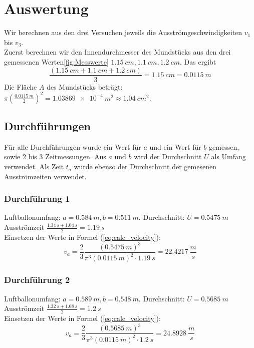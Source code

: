 \documentclass{article}
\begin{document}
    \section{Auswertung}
    Wir berechnen aus den drei Versuchen jeweils die Ausströmgeschwindigkeiten \(v_1\) bis \(v_3\). \\
    Zuerst berechnen wir den Innendurchmesser des Mundstücks aus den drei gemessenen Werten\ref{fig:Messwerte}
    \(\SI{1.15}{cm}, \SI{1.1}{cm}, \SI{1.2}{cm} \). Das ergibt
    \begin{equation}
        \frac{ (\SI{1.15}{cm} + \SI{1.1}{cm} + \SI{1.2}{cm}) }{3} = \SI{1.15}{cm} = \SI{0.0115}{m}
    \end{equation}
    Die Fläche \(A\) des Mundstücks beträgt\label{eq:fläche_berechnet}: \( \pi {\left( \frac{ \SI{0.0115}{m} }{2} \right)}^2 = \SI{1.03869e-4}{m^2} \approx \SI{1.04}{{cm}^2}\).

    \subsection{Durchführungen}
    Für alle Durchführungen wurde ein Wert für \(a\) und ein Wert für \(b\) gemessen, sowie 2 bis 3 Zeitmessungen.
    Aus \(a\) und \(b\) wird der Durchschnitt \(U\) als Umfang verwendet.
    Als Zeit \(t_a\) wurde ebenso der Durchschnitt der gemesenen Ausströmzeiten verwendet.

    \subsubsection{Durchführung 1}
        Luftballonumfang: \(a = \SI{0.584}{m}, b = \SI{0.511}{m} \). Durchschnitt: \(U = \SI{0.5475}{m}\) \\
        Ausströmzeit \( \frac{\SI{1.34}{s} + \SI{1.04}{s} }{2} = \SI{1.19}{s} \) \\
        Einsetzen der Werte in Formel (\ref{eq:calc_velocity}):
        \[ v_a = \frac{2}{3} \frac{{( \SI{0.5475}{m} )}^3}{\pi^3 {( \SI{0.0115}{m} )}^2 \cdot \SI{1.19}{s} } = \SI{22.4217}{\frac{m}{s}} \]

    \subsubsection{Durchführung 2}
        Luftballonumfang: \(a = \SI{0.589}{m}, b = \SI{0.548}{m} \). Durchschnitt: \(U = \SI{0.5685}{m} \) \\
        Ausströmzeit \( \frac{\SI{1.32}{s} + \SI{1.08}{s} }{2} = \SI{1.2}{s} \) \\
        Einsetzen der Werte in Formel (\ref{eq:calc_velocity}):
        \[ v_a = \frac{2}{3} \frac{{( \SI{0.5685}{m} )}^3}{\pi^3 {( \SI{0.0115}{m} )}^2 \cdot \SI{1.2}{s} } = \SI{24.8928}{\frac{m}{s}} \]
\end{document}
